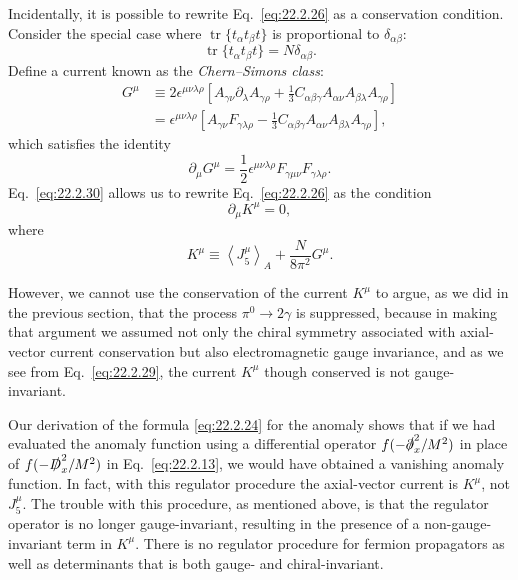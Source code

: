 Incidentally, it is possible to rewrite Eq.~\eqref{eq:22.2.26} as a
conservation condition. Consider the special case where
$\operatorname{tr}\{t_\alpha t_\beta t\}$ is proportional to
$\delta_{\alpha\beta}$:
\begin{equation}
 \operatorname{tr}\{t_\alpha t_\beta t\}=N\delta_{\alpha\beta}.
 \tag{22.2.28}\label{eq:22.2.28}
\end{equation}
Define a current known as the \emph{Chern--Simons class}:
\begin{equation}
 \begin{aligned}
 G^\mu
 &\equiv2\epsilon^{\mu\nu\lambda\rho}
 \left[
 A_{\gamma\nu}\partial_\lambda A_{\gamma\rho}
 +\frac13C_{\alpha\beta\gamma}
 A_{\alpha\nu}A_{\beta\lambda}A_{\gamma\rho}
 \right]\\
 &=\epsilon^{\mu\nu\lambda\rho}
 \left[
 A_{\gamma\nu}F_{\gamma\lambda\rho}
 -\frac13C_{\alpha\beta\gamma}
 A_{\alpha\nu}A_{\beta\lambda}A_{\gamma\rho}
 \right],
 \end{aligned}
 \tag{22.2.29}\label{eq:22.2.29}
\end{equation}
which satisfies the identity
\begin{equation}
 \partial_\mu G^\mu
 =\frac12\epsilon^{\mu\nu\lambda\rho}
 F_{\gamma\mu\nu}F_{\gamma\lambda\rho}.
 \tag{22.2.30}\label{eq:22.2.30}
\end{equation}
Eq.~\eqref{eq:22.2.30} allows us to rewrite Eq.~\eqref{eq:22.2.26} as the
condition
\begin{equation}
 \partial_\mu K^\mu=0,
 \tag{22.2.31}\label{eq:22.2.31}
\end{equation}
where
\begin{equation}
 K^\mu\equiv\left\langle J_5^\mu\right\rangle_A
 +\frac{N}{8\pi^2}G^\mu.
 \tag{22.2.32}\label{eq:22.2.32}
\end{equation}

However, we cannot use the conservation of the current $K^\mu$ to argue,
as we did in the previous section, that the process $\pi^0\to2\gamma$ is
suppressed, because in making that argument we assumed not only the chiral
symmetry associated with axial-vector current conservation but also
electromagnetic gauge invariance, and as we see from
Eq.~\eqref{eq:22.2.29}, the current $K^\mu$ though conserved is not
gauge-invariant.

Our derivation of the formula \eqref{eq:22.2.24} for the anomaly shows that
if we had evaluated the anomaly function using a differential operator
$f(-\sl{\partial}_x^2/M^2)$ in place of $f(-\sl{D}_x^2/M^2)$ in
Eq.~\eqref{eq:22.2.13}, we would have obtained a vanishing anomaly
function. In fact, with this regulator procedure the axial-vector current
is $K^\mu$, not $J_5^\mu$. The trouble with this procedure, as mentioned
above, is that the regulator operator is no longer gauge-invariant,
resulting in the presence of a non-gauge-invariant term in $K^\mu$. There
is no regulator procedure for fermion propagators as well as determinants
that is both gauge- and chiral-invariant.

